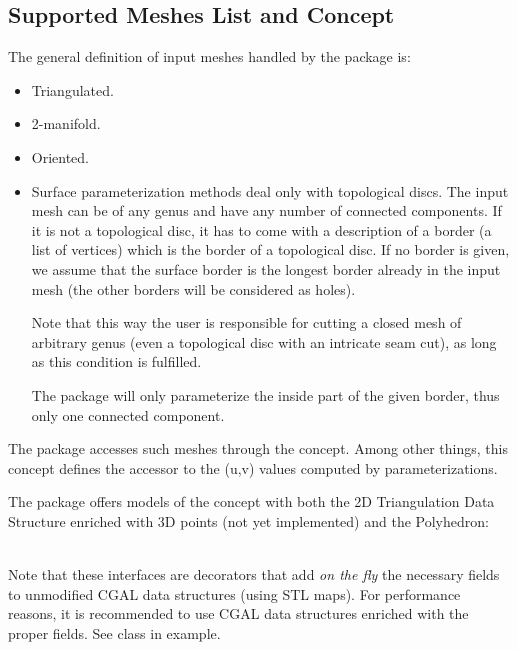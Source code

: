 \subsection{Supported Meshes List and Concept}

The general definition of input meshes handled by the package is:

\begin{itemize}

\item Triangulated.

\item 2-manifold.

\item Oriented.

\item Surface parameterization methods deal only with topological discs.
The input mesh can be of any genus and have any number of connected components.
If it is not a topological disc, it has to come with a description of a border
(a list of vertices) which is the border of a topological disc.
If no border is given, we assume that the surface border
is the longest border already in the input mesh (the other borders will
be considered as holes).

Note that this way the user is responsible for cutting a closed mesh of
arbitrary genus (even a topological disc with an intricate seam
cut), as long as this condition is fulfilled.

The package will only parameterize the inside part of the given border,
thus only one connected component.

\end{itemize}

The package accesses such meshes through the  concept. Among other
things, this concept defines the accessor to the (u,v) values computed
by parameterizations.

The package offers models of the concept
 with both the 2D Triangulation Data Structure enriched
with 3D points (not yet implemented) and the Polyhedron:

  \\

Note that these interfaces are decorators that add {\em on the fly} the necessary
fields to unmodified CGAL data structures (using STL maps).
For performance reasons, it is recommended to use CGAL data structures
enriched with the proper fields.
See  class in  example.


